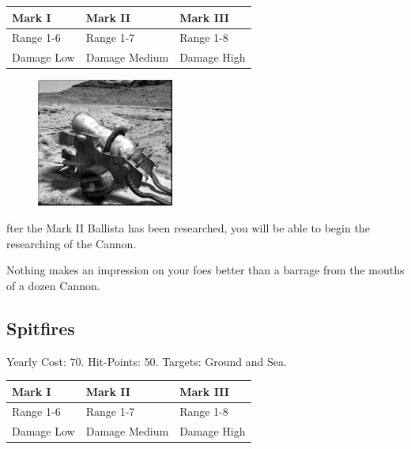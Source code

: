 \begin{tabular}{ | p{1.3in} | p{1.3in} | p{1.3in} |}
	\hline
	\textbf{Mark I}	& \textbf{Mark II} & \textbf{Mark III} \\ \hline
	Range 1-6	& Range 1-7 & Range 1-8 \\ \hline
	Damage Low	& Damage Medium & Damage High \\ \hline
\end{tabular}
   
\begin{figure}
	\vspace{-20pt}
	\begin{center}
		\includegraphics[width=0.4\textwidth]{Acannon}
	\end{center}
	\vspace{-50pt}
\end{figure}

fter the Mark II Ballista has been researched, you will be able to begin the researching of the Cannon.

Nothing makes an impression on your foes better than a barrage from the mouths of a dozen Cannon.

\subsection{Spitfires}



\begin{center}
	Yearly Cost: 70. Hit-Points: 50. Targets: Ground and Sea.
\end{center}

\begin{tabular}{ | p{1.3in} | p{1.3in} | p{1.3in} |}
	\hline
	\textbf{Mark I}	& \textbf{Mark II} & \textbf{Mark III} \\ \hline
	Range 1-6	& Range 1-7 & Range 1-8 \\ \hline
	Damage Low	& Damage Medium & Damage High \\ \hline
\end{tabular}

